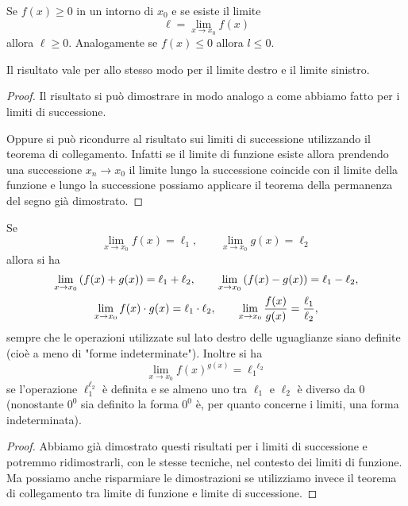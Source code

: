 \begin{theorem}
\mymark{***}
Se $f(x)\ge 0$ in un intorno di $x_0$ e se esiste il limite
\[
 \ell = \lim_{x\to x_0} f(x)
\]
allora $\ell\ge 0$.
Analogamente se $f(x)\le 0$ allora $l \le 0$.

Il risultato vale per allo stesso modo per il limite destro e il limite
sinistro.
\end{theorem}
%
\begin{proof}
Il risultato si può dimostrare in modo analogo a come abbiamo fatto per i limiti di successione.

Oppure si può ricondurre al risultato sui limiti di successione utilizzando il teorema di collegamento. Infatti se il limite di funzione esiste allora prendendo una successione $x_n\to x_0$ il limite lungo la successione coincide con il limite della funzione e lungo la successione possiamo applicare il teorema della permanenza del segno già dimostrato.
\end{proof}

\begin{theorem}
Se
\[
  \lim_{x\to x_0}f(x) = \ell_1,\qquad
  \lim_{x\to x_0}g(x) = \ell_2
\]
allora si ha
\begin{gather*}
\lim_{x\to x_0} {\left( f(x) + g(x) \right)} = \ell_1 + \ell_2, \qquad
\lim_{x\to x_0} {\left( f(x) - g(x) \right)} = \ell_1 - \ell_2, \\
  \lim_{x\to x_0} f(x)\cdot g(x) = \ell_1 \cdot \ell_2, \qquad
  \lim_{x\to x_0} \frac{f(x)}{g(x)} = \frac{\ell_1}{\ell_2}, \\
\end{gather*}
sempre che le operazioni utilizzate sul lato destro delle uguaglianze
siano definite (cioè a meno di "forme indeterminate").
Inoltre si ha
\[
  \lim_{x\to x_0} f(x) ^ {g(x)} = {\ell_1} ^ {\ell_2}
\]
se l'operazione $\ell_1^{\ell_2}$ è definita e se almeno uno tra $\ell_1$ e $\ell_2$ è diverso da $0$ (nonostante $0^0$ sia definito la forma $0^0$ è, per quanto concerne i limiti, una forma indeterminata).
\end{theorem}
%
\begin{proof}
Abbiamo già dimostrato questi risultati per i limiti di successione
e potremmo ridimostrarli, con le stesse tecniche, nel contesto dei limiti di funzione.
Ma possiamo anche risparmiare le dimostrazioni se utilizziamo
invece il teorema di
collegamento tra limite di funzione e limite di successione.
\end{proof}

